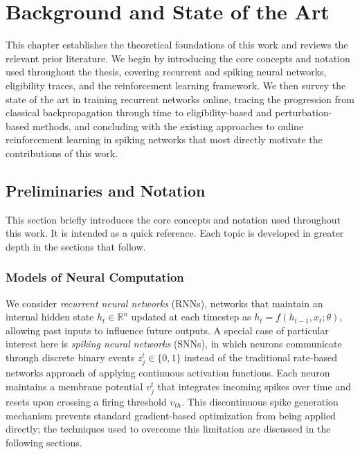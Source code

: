 
\chapter{Background and State of the Art}
\label{ch:sota}

This chapter establishes the theoretical foundations of this work and reviews
the relevant prior literature. We begin by introducing the core concepts and
notation used throughout the thesis, covering recurrent and spiking neural
networks, eligibility traces, and the reinforcement learning framework. We
then survey the state of the art in training recurrent networks online,
tracing the progression from classical backpropagation through time to eligibility-based and perturbation-based methods, and concluding with
the existing approaches to online reinforcement learning in spiking networks
that most directly motivate the contributions of this work.

\section{Preliminaries and Notation}
\label{sec:preliminaries}

This section briefly introduces the core concepts and notation used
throughout this work. It is intended as a quick reference. Each topic is developed in greater depth in the
sections that follow.

\subsection{Models of Neural Computation}

We consider \emph{recurrent neural networks} (RNNs), networks that maintain
an internal hidden state $h_t \in \mathbb{R}^n$ updated at each timestep as
$h_t = f(h_{t-1}, x_t; \theta)$, allowing past inputs to influence future
outputs. A special case of particular interest here is \emph{spiking neural
networks} (SNNs), in which neurons communicate through discrete binary events
$z^t_j \in \{0, 1\}$ instead of the traditional rate-based networks approach of applying continuous activation functions. Each neuron
maintains a membrane potential $v^t_j$ that integrates incoming spikes over
time and resets upon crossing a firing threshold $v_{th}$. This
discontinuous spike generation mechanism prevents standard gradient-based
optimization from being applied directly; the techniques used to overcome
this limitation are discussed in the following sections.

